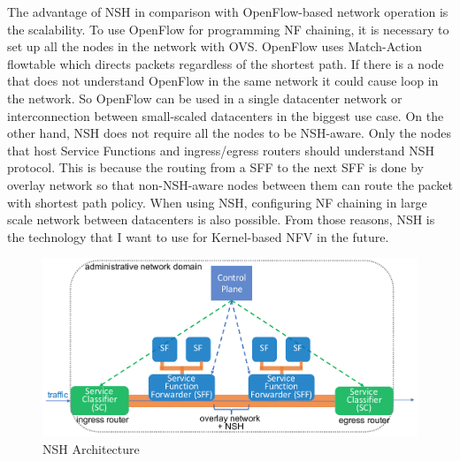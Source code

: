 \begin{itemize}
			The advantage of NSH in comparison with OpenFlow-based network operation is the scalability. To use OpenFlow for programming NF chaining, it is necessary to set up all the nodes in the network with OVS. OpenFlow uses Match-Action flowtable which directs packets regardless of the shortest path. If there is a node that does not understand OpenFlow in the same network it could cause loop in the network. So OpenFlow can be used in a single datacenter network or interconnection between small-scaled datacenters in the biggest use case. On the other hand, NSH does not require all the nodes to be NSH-aware. Only the nodes that host Service Functions and ingress/egress routers should understand NSH protocol. This is because the routing from a SFF to the next SFF is done by overlay network so that non-NSH-aware nodes between them can route the packet with shortest path policy. When using NSH, configuring NF chaining in large scale network between datacenters is also possible. From those reasons, NSH is the technology that I want to use for Kernel-based NFV in the future. 
	\end{itemize}
	
\begin{figure}[t]
	\centering
	\includegraphics[width=120mm]{pics/NSH.pdf}
	\caption{NSH Architecture}
	\label{fig: NSH}
\end{figure}













